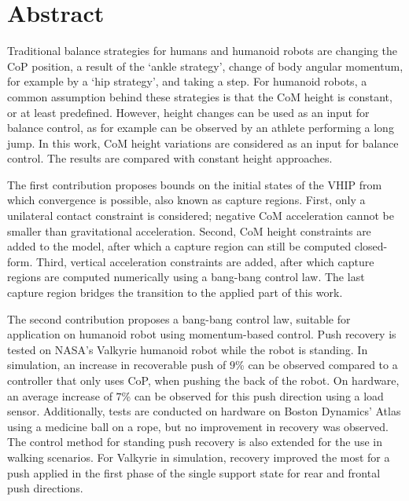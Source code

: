 %
\chapter*{Abstract}%

Traditional balance strategies for humans and humanoid robots are changing the \ac{CoP} position, a result of the `ankle strategy', change of body angular momentum, for example by a `hip strategy', and taking a step. For humanoid robots, a common assumption behind these strategies is that the \ac{CoM} height is constant, or at least predefined. However, height changes can be used as an input for balance control, as for example can be observed by an athlete performing a long jump. In this work, \ac{CoM} height variations are considered as an input for balance control. The results are compared with constant height approaches.

The first contribution proposes bounds on the initial states of the \ac{VHIP} from which convergence is possible, also known as capture regions. First, only a unilateral contact constraint is considered; negative \ac{CoM} acceleration cannot be smaller than gravitational acceleration. Second, \ac{CoM} height constraints are added to the model, after which a capture region can still be computed closed-form. Third, vertical acceleration constraints are added, after which capture regions are computed numerically using a bang-bang control law. The last capture region bridges the transition to the applied part of this work.

The second contribution proposes a bang-bang control law, suitable for application on humanoid robot using momentum-based control. Push recovery is tested on NASA's Valkyrie humanoid robot while the robot is standing. In simulation, an increase in recoverable push of $9$\% can be observed compared to a controller that only uses \ac{CoP}, when pushing the back of the robot. On hardware, an average increase of $7$\% can be observed for this push direction using a load sensor. Additionally, tests are conducted on hardware on Boston Dynamics' Atlas using a medicine ball on a rope, but no improvement in recovery was observed. The control method for standing push recovery is also extended for the use in walking scenarios. For Valkyrie in simulation, recovery improved the most for a push applied in the first phase of the single support state for rear and frontal push directions. 